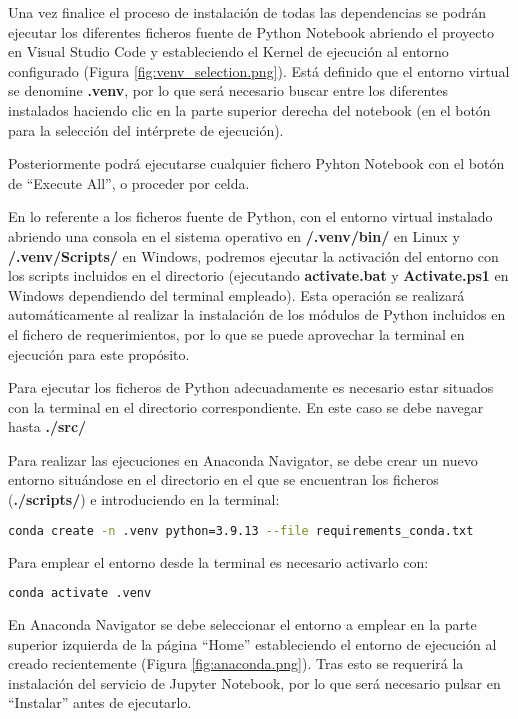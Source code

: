 Una vez finalice el proceso de instalación de todas las dependencias se podrán ejecutar los diferentes ficheros fuente de Python Notebook abriendo el proyecto en Visual Studio Code
y estableciendo el Kernel de ejecución al entorno configurado (Figura \ref{fig:venv_selection.png}).
Está definido que el entorno virtual se denomine \textbf{.venv}, por lo que será necesario buscar entre los diferentes 
instalados haciendo clic en la parte superior derecha del notebook (en el botón para la selección del intérprete de ejecución).



Posteriormente podrá ejecutarse cualquier fichero Pyhton Notebook con el botón de ``Execute All'', o proceder por celda.

En lo referente a los ficheros fuente de Python, con el entorno virtual instalado abriendo una consola en el sistema operativo en \textbf{/.venv/bin/} en Linux y \textbf{/.venv/Scripts/}
en Windows, podremos ejecutar la activación del entorno con los scripts incluidos en el directorio (ejecutando \linebreak \textbf{activate.bat} y \textbf{Activate.ps1} en Windows dependiendo del terminal empleado).
Esta operación se realizará automáticamente al realizar la instalación de los módulos de Python incluidos en el fichero de requerimientos, por lo que se puede aprovechar la terminal en ejecución para 
este propósito.

Para ejecutar los ficheros de Python adecuadamente es necesario estar situados con la terminal en el directorio correspondiente. En este caso se debe navegar hasta \textbf{./src/}

Para realizar las ejecuciones en Anaconda Navigator, se debe crear un nuevo entorno situándose en el directorio en el que se encuentran los ficheros (\textbf{./scripts/}) e introduciendo en la terminal:
\begin{lstlisting}[language=Bash, basicstyle=\scriptsize]
    conda create -n .venv python=3.9.13 --file requirements_conda.txt
\end{lstlisting}

Para emplear el entorno desde la terminal es necesario activarlo con:
\begin{lstlisting}[language=Bash]
    conda activate .venv
\end{lstlisting}

En Anaconda Navigator se debe seleccionar el entorno a emplear en la parte superior izquierda 
de la página ``Home'' estableciendo el entorno de ejecución al creado recientemente (Figura \ref{fig:anaconda.png}).
Tras esto se requerirá la instalación del servicio de Jupyter Notebook, por lo que será necesario pulsar en ``Instalar'' antes de ejecutarlo.

